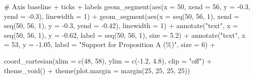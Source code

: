 \documentclass[
  letterpaper,
  DIV=11,
  numbers=noendperiod]{scrreprt}
\newenvironment{Shaded}{\begin{snugshade}}{\end{snugshade}}
\newcommand{\AttributeTok}[1]{\textcolor[rgb]{0.40,0.45,0.13}{#1}}
\newcommand{\CommentTok}[1]{\textcolor[rgb]{0.37,0.37,0.37}{#1}}
\newcommand{\DecValTok}[1]{\textcolor[rgb]{0.68,0.00,0.00}{#1}}
\newcommand{\FloatTok}[1]{\textcolor[rgb]{0.68,0.00,0.00}{#1}}
\newcommand{\FunctionTok}[1]{\textcolor[rgb]{0.28,0.35,0.67}{#1}}
\newcommand{\NormalTok}[1]{\textcolor[rgb]{0.00,0.23,0.31}{#1}}
\newcommand{\SpecialCharTok}[1]{\textcolor[rgb]{0.37,0.37,0.37}{#1}}
\newcommand{\StringTok}[1]{\textcolor[rgb]{0.13,0.47,0.30}{#1}}
\begin{document}
\begin{Shaded}
\begin{Highlighting}[]
  \CommentTok{\# Axis baseline + ticks + labels}
  \FunctionTok{geom\_segment}\NormalTok{(}\FunctionTok{aes}\NormalTok{(}\AttributeTok{x =} \DecValTok{50}\NormalTok{, }\AttributeTok{xend =} \DecValTok{56}\NormalTok{, }\AttributeTok{y =} \SpecialCharTok{{-}}\FloatTok{0.3}\NormalTok{, }\AttributeTok{yend =} \SpecialCharTok{{-}}\FloatTok{0.3}\NormalTok{), }\AttributeTok{linewidth =} \DecValTok{1}\NormalTok{) }\SpecialCharTok{+}
  \FunctionTok{geom\_segment}\NormalTok{(}\FunctionTok{aes}\NormalTok{(}\AttributeTok{x =} \FunctionTok{seq}\NormalTok{(}\DecValTok{50}\NormalTok{, }\DecValTok{56}\NormalTok{, }\DecValTok{1}\NormalTok{), }\AttributeTok{xend =} \FunctionTok{seq}\NormalTok{(}\DecValTok{50}\NormalTok{, }\DecValTok{56}\NormalTok{, }\DecValTok{1}\NormalTok{), }\AttributeTok{y =} \SpecialCharTok{{-}}\FloatTok{0.3}\NormalTok{, }\AttributeTok{yend =} \SpecialCharTok{{-}}\FloatTok{0.42}\NormalTok{),}
               \AttributeTok{linewidth =} \DecValTok{1}\NormalTok{) }\SpecialCharTok{+}
  \FunctionTok{annotate}\NormalTok{(}\StringTok{"text"}\NormalTok{, }\AttributeTok{x =} \FunctionTok{seq}\NormalTok{(}\DecValTok{50}\NormalTok{, }\DecValTok{56}\NormalTok{, }\DecValTok{1}\NormalTok{), }\AttributeTok{y =} \SpecialCharTok{{-}}\FloatTok{0.62}\NormalTok{, }\AttributeTok{label =} \FunctionTok{seq}\NormalTok{(}\DecValTok{50}\NormalTok{, }\DecValTok{56}\NormalTok{, }\DecValTok{1}\NormalTok{), }\AttributeTok{size =} \FloatTok{5.2}\NormalTok{) }\SpecialCharTok{+}
  \FunctionTok{annotate}\NormalTok{(}\StringTok{"text"}\NormalTok{, }\AttributeTok{x =} \DecValTok{53}\NormalTok{, }\AttributeTok{y =} \SpecialCharTok{{-}}\FloatTok{1.05}\NormalTok{, }\AttributeTok{label =} \StringTok{"Support for Proposition A (\%)"}\NormalTok{, }\AttributeTok{size =} \DecValTok{6}\NormalTok{) }\SpecialCharTok{+}

  \FunctionTok{coord\_cartesian}\NormalTok{(}\AttributeTok{xlim =} \FunctionTok{c}\NormalTok{(}\DecValTok{48}\NormalTok{, }\DecValTok{58}\NormalTok{), }\AttributeTok{ylim =} \FunctionTok{c}\NormalTok{(}\SpecialCharTok{{-}}\FloatTok{1.2}\NormalTok{, }\FloatTok{4.8}\NormalTok{), }\AttributeTok{clip =} \StringTok{"off"}\NormalTok{) }\SpecialCharTok{+}
  \FunctionTok{theme\_void}\NormalTok{() }\SpecialCharTok{+}
  \FunctionTok{theme}\NormalTok{(}\AttributeTok{plot.margin =} \FunctionTok{margin}\NormalTok{(}\DecValTok{25}\NormalTok{, }\DecValTok{25}\NormalTok{, }\DecValTok{25}\NormalTok{, }\DecValTok{25}\NormalTok{))}
\end{Highlighting}
\end{Shaded}
\end{document}

